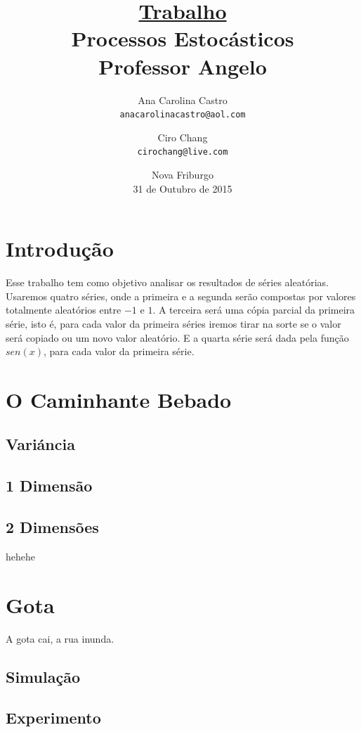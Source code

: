 \documentclass[12pt,a4paper]{article}
\title{\textbf{\underline{Trabalho}\\[0.5cm]
Processos Estocásticos}\\[0.3cm]\large{Professor Angelo}\\[1.5cm]}
\author{
	Ana Carolina Castro\\
	\texttt{anacarolinacastro@aol.com}
	\and
	Ciro Chang\\
	\texttt{cirochang@live.com}
	\\[1.5cm]
}
\date{Nova Friburgo\\31 de Outubro de 2015}
\begin{document}
\maketitle
\thispagestyle{empty}

\newpage
\tableofcontents

\newpage
\section{Introdução}
Esse trabalho tem como objetivo analisar os resultados de séries aleatórias. Usaremos quatro séries, onde
a primeira e a segunda serão compostas por valores totalmente aleatórios entre $-1$ e $1$. A terceira será uma cópia parcial da primeira série, isto é, para cada valor da primeira séries iremos tirar na sorte se o valor será copiado ou um novo valor aleatório. E a quarta série será dada pela função $sen(x)$, para cada valor da primeira série.\\[1cm]

\section{O Caminhante Bebado}
\subsection{Variáncia}
\subsection{1 Dimensão}
\subsection{2 Dimensões}
hehehe\\[1.5cm]

\section{Gota}
A gota cai, a rua inunda.
\subsection{Simulação}
\subsection{Experimento}
\end{document}
